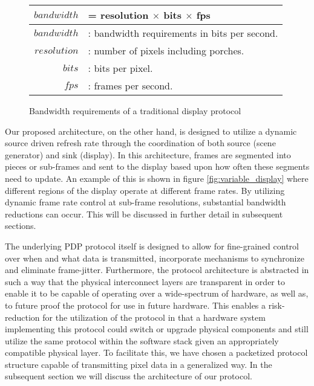 \begin{figure}
    \centering
    \begin{tabular}{| r l |}
        \hline
        $$bandwidth$$ & = resolution $\times$ bits $\times$ fps \\ \hline
        $bandwidth$ & : bandwidth requirements in bits per second. \\
        $resolution$ & : number of pixels including porches. \\
        $bits$ & : bits per pixel. \\
        $fps$ & : frames per second. \\
        \hline
    \end{tabular}
    \caption{Bandwidth requirements of a traditional display protocol}
    \label{fig:bandwidth}
\end{figure}

Our proposed architecture, on the other hand, is designed to utilize a dynamic source driven refresh rate through the coordination of both source (scene generator) and sink (display). In this architecture, frames are segmented into pieces or sub-frames and sent to the display based upon how often these segments need to update. An example of this is shown in figure \ref{fig:variable_display} where different regions of the display operate at different frame rates. By utilizing dynamic frame rate control at sub-frame resolutions, substantial bandwidth reductions can occur. This will be discussed in further detail in subsequent sections.

The underlying PDP protocol itself is designed to allow for fine-grained control over when and what data is transmitted, incorporate mechanisms to synchronize and eliminate frame-jitter. Furthermore, the protocol architecture is abstracted in such a way that the physical interconnect layers are transparent in order to enable it to be capable of operating over a wide-spectrum of hardware, as well as, to future proof the protocol for use in future hardware. This enables a risk-reduction for the utilization of the protocol in that a hardware system implementing this protocol could switch or upgrade physical components and still utilize the same protocol within the software stack given an appropriately compatible physical layer. To facilitate this, we have chosen a packetized protocol structure capable of transmitting pixel data in a generalized way. In the subsequent section we will discuss the architecture of our protocol.
